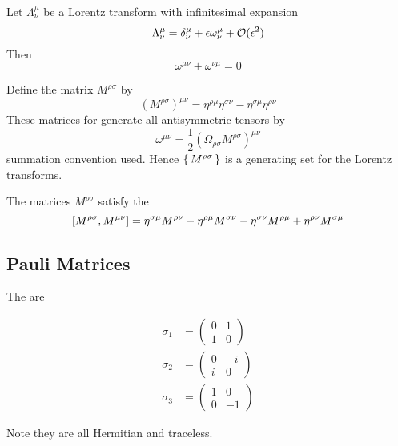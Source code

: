 \documentclass{article}
\begin{document}
\begin{theorem}
Let $\Lambda^\mu_\nu$ be a Lorentz transform with infinitesimal expansion 
\[
\Lambda^\mu_\nu=\delta^\mu_\nu+\eps \omega^\mu_\nu +\mathcal{O}(\eps^2) 
\]
Then 
\[
\omega^{\mu\nu}+\omega^{\nu\mu}=0
\]
\end{theorem}

\begin{definition}
Define the matrix $M^{\rho\sigma}$ by 
\[
\left( M^{\rho\sigma} \right)^{\mu\nu} = \eta^{\rho\mu}\eta^{\sigma\nu}-\eta^{\sigma\mu}\eta^{\rho\nu}
\]
These matrices for generate all antisymmetric tensors by \[
\omega^{\mu\nu}=\frac{1}{2}\left(\Omega_{\rho\sigma}M^{\rho\sigma}\right)^{\mu\nu}
\]
summation convention used. Hence $\set{M^{\rho\sigma}}$ is a generating set for the Lorentz transforms. 
\end{definition}

\begin{definition}
The matrices $M^{\rho\sigma}$ satisfy the 
\[
\comm[M^{\rho\sigma}]{M^{\mu\nu}}=\eta^{\sigma\mu}M^{\rho\nu}-\eta^{\rho\mu}M^{\sigma\nu}-\eta^{\sigma\nu}M^{\rho\mu}+\eta^{\rho\nu}M^{\sigma\mu}
\]
\end{definition}

\subsection{Pauli Matrices}

\begin{definition}
The  are

\begin{align*}
\sigma_1 &= \begin{pmatrix} 0 & 1 \\ 1 & 0\end{pmatrix}  \\
\sigma_2 &= \begin{pmatrix} 0 & -i \\ i & 0\end{pmatrix}  \\
\sigma_3 &= \begin{pmatrix} 1 & 0 \\ 0 & -1\end{pmatrix}  
\end{align*}

Note they are all Hermitian and traceless.
\end{definition}
\end{document}
